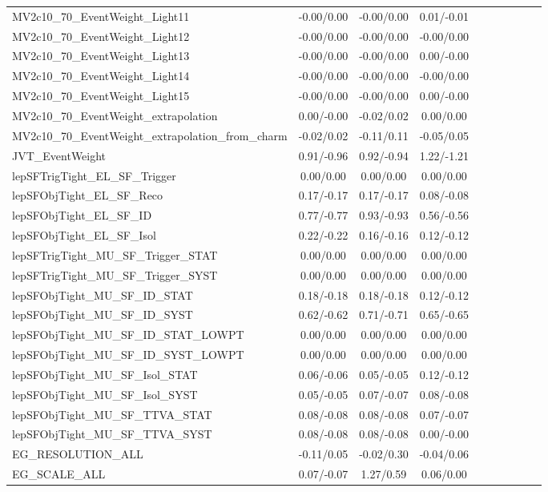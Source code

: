 \begin{table}[h]
\begin{center}
\begin{tabular}{l|ccccccccc}
MV2c10\_70\_EventWeight\_Light11 &-0.00/0.00 &-0.00/0.00 &0.01/-0.01 \\
MV2c10\_70\_EventWeight\_Light12 &-0.00/0.00 &-0.00/0.00 &-0.00/0.00 \\
MV2c10\_70\_EventWeight\_Light13 &-0.00/0.00 &-0.00/0.00 &0.00/-0.00 \\
MV2c10\_70\_EventWeight\_Light14 &-0.00/0.00 &-0.00/0.00 &-0.00/0.00 \\
MV2c10\_70\_EventWeight\_Light15 &-0.00/0.00 &-0.00/0.00 &0.00/-0.00 \\
MV2c10\_70\_EventWeight\_extrapolation &0.00/-0.00 &-0.02/0.02 &0.00/0.00 \\
MV2c10\_70\_EventWeight\_extrapolation\_from\_charm &-0.02/0.02 &-0.11/0.11 &-0.05/0.05 \\
JVT\_EventWeight &0.91/-0.96 &0.92/-0.94 &1.22/-1.21 \\
lepSFTrigTight\_EL\_SF\_Trigger &0.00/0.00 &0.00/0.00 &0.00/0.00 \\
lepSFObjTight\_EL\_SF\_Reco &0.17/-0.17 &0.17/-0.17 &0.08/-0.08 \\
lepSFObjTight\_EL\_SF\_ID &0.77/-0.77 &0.93/-0.93 &0.56/-0.56 \\
lepSFObjTight\_EL\_SF\_Isol &0.22/-0.22 &0.16/-0.16 &0.12/-0.12 \\
lepSFTrigTight\_MU\_SF\_Trigger\_STAT &0.00/0.00 &0.00/0.00 &0.00/0.00 \\
lepSFTrigTight\_MU\_SF\_Trigger\_SYST &0.00/0.00 &0.00/0.00 &0.00/0.00 \\
lepSFObjTight\_MU\_SF\_ID\_STAT &0.18/-0.18 &0.18/-0.18 &0.12/-0.12 \\
lepSFObjTight\_MU\_SF\_ID\_SYST &0.62/-0.62 &0.71/-0.71 &0.65/-0.65 \\
lepSFObjTight\_MU\_SF\_ID\_STAT\_LOWPT &0.00/0.00 &0.00/0.00 &0.00/0.00 \\
lepSFObjTight\_MU\_SF\_ID\_SYST\_LOWPT &0.00/0.00 &0.00/0.00 &0.00/0.00 \\
lepSFObjTight\_MU\_SF\_Isol\_STAT &0.06/-0.06 &0.05/-0.05 &0.12/-0.12 \\
lepSFObjTight\_MU\_SF\_Isol\_SYST &0.05/-0.05 &0.07/-0.07 &0.08/-0.08 \\
lepSFObjTight\_MU\_SF\_TTVA\_STAT &0.08/-0.08 &0.08/-0.08 &0.07/-0.07 \\
lepSFObjTight\_MU\_SF\_TTVA\_SYST &0.08/-0.08 &0.08/-0.08 &0.00/-0.00 \\
EG\_RESOLUTION\_ALL &-0.11/0.05 &-0.02/0.30 &-0.04/0.06 \\
EG\_SCALE\_ALL &0.07/-0.07 &1.27/0.59 &0.06/0.00 \\

\end{tabular}
\end{center}
\end{table}
